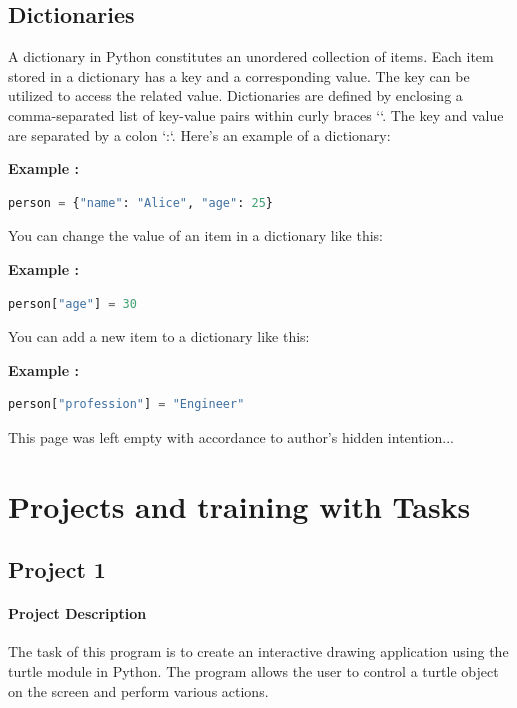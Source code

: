 \documentclass[12pt]{book}
\newtheorem{Example}{Example}[chapter]
\renewenvironment{Example}{\begin{trivlist}\item\relax
\textbf{Example \thesection: }}{\end{trivlist}}
\begin{document}
\section{Dictionaries}
A dictionary in Python constitutes an unordered collection of items. Each item stored in a dictionary has a key and a corresponding value. The key can be utilized to access the related value. Dictionaries are defined by enclosing a comma-separated list of key-value pairs within curly braces `{}`. The key and value are separated by a colon `:`. Here's an example of a dictionary:
\begin{Example}
\begin{lstlisting}[language=Python]
person = {"name": "Alice", "age": 25}
\end{lstlisting}
\end{Example}
You can change the value of an item in a dictionary like this:
\begin{Example}
\begin{lstlisting}[language=Python]
person["age"] = 30
\end{lstlisting}
\end{Example}
You can add a new item to a dictionary like this:
\begin{Example}
\begin{lstlisting}[language=Python]
person["profession"] = "Engineer"
\end{lstlisting}
\end{Example}

\newpage
\begin{center}
 This page was left empty with accordance to author's hidden intention...
\end{center}
\newpage
\chapter{Projects and training with Tasks}
\section{Project 1}
\subsubsection{Project Description}

The task of this program is to create an interactive drawing application using the turtle module in Python. The program allows the user to control a turtle object on the screen and perform various actions. 
\end{document}
